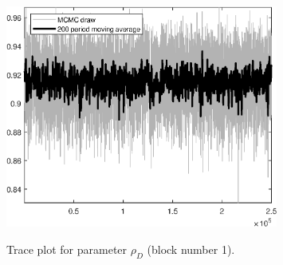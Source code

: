 \begin{figure}[H]
\centering
  \includegraphics[width=0.8\textwidth]{BRS_growth_ext_comovement/graphs/TracePlot_rho_D_blck_1}\\
    \caption{Trace plot for parameter ${\rho_D}$ (block number 1).}
\end{figure}
